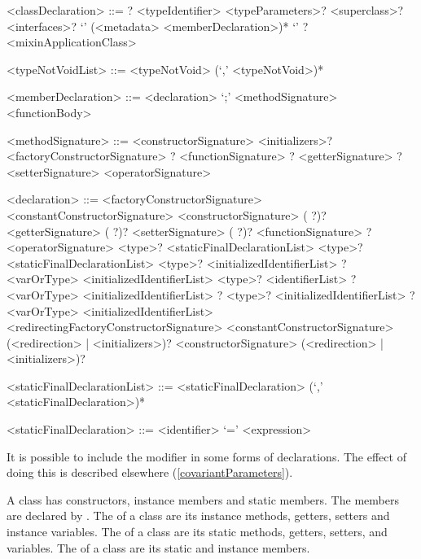 \documentclass[makeidx]{article}
\begin{document}
\begin{grammar}
<classDeclaration> ::=
  \ABSTRACT? \CLASS{} <typeIdentifier> <typeParameters>?
  \gnewline{} <superclass>? <interfaces>?
  \gnewline{} `{' (<metadata> <memberDeclaration>)* `}'
  \alt \ABSTRACT? \CLASS{} <mixinApplicationClass>

<typeNotVoidList> ::= <typeNotVoid> (`,' <typeNotVoid>)*

<memberDeclaration> ::= <declaration> `;'
  \alt <methodSignature> <functionBody>

<methodSignature> ::= <constructorSignature> <initializers>?
  \alt <factoryConstructorSignature>
  \alt \STATIC? <functionSignature>
  \alt \STATIC? <getterSignature>
  \alt \STATIC? <setterSignature>
  \alt <operatorSignature>

<declaration> ::= \EXTERNAL{} <factoryConstructorSignature>
  \alt \EXTERNAL{} <constantConstructorSignature>
  \alt \EXTERNAL{} <constructorSignature>
  \alt (\EXTERNAL{} \STATIC?)? <getterSignature>
  \alt (\EXTERNAL{} \STATIC?)? <setterSignature>
  \alt (\EXTERNAL{} \STATIC?)? <functionSignature>
  \alt \EXTERNAL? <operatorSignature>
  \alt \STATIC{} \CONST{} <type>? <staticFinalDeclarationList>
  \alt \STATIC{} \FINAL{} <type>? <staticFinalDeclarationList>
  \alt \STATIC{} \LATE{} \FINAL{} <type>? <initializedIdentifierList>
  \alt \STATIC{} \LATE? <varOrType> <initializedIdentifierList>
  \alt \COVARIANT{} \LATE{} \FINAL{} <type>? <identifierList>
  \alt \COVARIANT{} \LATE? <varOrType> <initializedIdentifierList>
  \alt \LATE? \FINAL{} <type>? <initializedIdentifierList>
  \alt \LATE? <varOrType> <initializedIdentifierList>
  \alt <redirectingFactoryConstructorSignature>
  \alt <constantConstructorSignature> (<redirection> | <initializers>)?
  \alt <constructorSignature> (<redirection> | <initializers>)?

<staticFinalDeclarationList> ::= \gnewline{}
  <staticFinalDeclaration> (`,' <staticFinalDeclaration>)*

<staticFinalDeclaration> ::= <identifier> `=' <expression>
\end{grammar}

\LMHash{}%
It is possible to include the modifier \COVARIANT{}
in some forms of declarations.
The effect of doing this is described elsewhere
(\ref{covariantParameters}).

\LMHash{}%
A class has constructors, instance members and static members.
The members are declared by
.
The  of a class
are its instance methods, getters, setters and instance variables.
The  of a class
are its static methods, getters, setters, and variables.
The  of a class
are its static and instance members.
\end{document}
